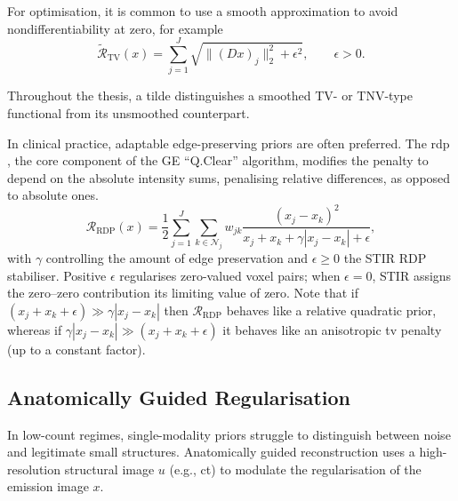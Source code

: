 For optimisation, it is common to use a smooth approximation to avoid nondifferentiability at zero, for example
\begin{equation}
    \widetilde{\mathcal{R}}_{\mathrm{TV}}(x)
    = \sum_{j=1}^J \sqrt{\|(D x)_j\|_2^2 + \epsilon^2},
    \qquad \epsilon>0.
\end{equation}

Throughout the thesis, a tilde distinguishes a smoothed TV- or TNV-type functional from its unsmoothed counterpart.

In clinical practice, adaptable edge-preserving priors are often preferred. The \gls{rdp} \cite{nuytsConcavePriorPenalizing2002}, the core component of the GE ``Q.Clear'' algorithm, modifies the penalty to depend on the absolute intensity sums, penalising relative differences, as opposed to absolute ones.
\begin{equation}
    \mathcal{R}_{\mathrm{RDP}}(x)
    = \frac{1}{2}\sum_{j=1}^J \sum_{k \in \mathcal{N}_j} w_{jk}
    \frac{(x_j-x_k)^2}{x_j+x_k + \gamma|x_j-x_k| + \epsilon},
    \label{eq:rdp}
\end{equation}
with $\gamma$ controlling the amount of edge preservation and $\epsilon\geq0$ the STIR RDP stabiliser. Positive $\epsilon$ regularises zero-valued voxel pairs; when $\epsilon=0$, STIR assigns the zero--zero contribution its limiting value of zero. Note that if $(x_j+x_k+\epsilon)\gg \gamma|x_j-x_k|$ then $\mathcal R_{\mathrm{RDP}}$ behaves like a relative quadratic prior,
whereas if $\gamma|x_j-x_k|\gg (x_j+x_k+\epsilon)$ it behaves like an anisotropic \gls{tv} penalty (up to a constant factor).

\subsection{Anatomically Guided Regularisation}\label{subsec:anatomical_recon}
In low-count regimes, single-modality priors struggle to distinguish between noise and legitimate small structures. Anatomically guided reconstruction uses a high-resolution structural image $u$ (e.g., \gls{ct}) to modulate the regularisation of the emission image $x$.

